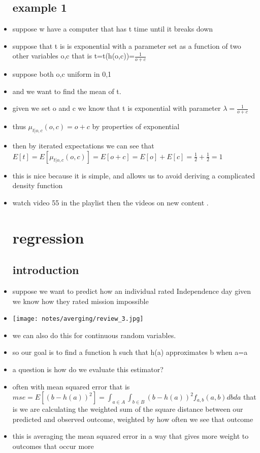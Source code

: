\documentclass{article}
\begin{document}
\begin{itemize}
\subsection{example 1 }
\item suppose w have a computer that has t time until it breaks down 
\item suppose that t is is exponential with a parameter set as a function of two other variables o,c that is t=t(h(o,c))=$\frac{1}{o+c}$
\item suppose both o,c uniform in 0,1 
\item and we want to find the mean of t. 
\item given we set o and c we know that t is exponential with parameter $\lambda=\frac{1}{o+c}$
\item thus $\mu_{t|o,c}(o,c)=o+c$ by properties of exponential 
\item then by iterated expectations we can see that $E[t]=E[\mu_{t|o,c}(o,c)]=E[o+c]=E[o]+E[c]=\frac{1}{2}+\frac{1}{2}=1$
\item this is nice because it is simple, and allows us to avoid deriving a complicated density function 
\item watch video 55 in the playlist then the videos on new content .


\section{regression}
\subsection{introduction}
\item suppose we want to predict how an individual rated Independence day given we know how they rated mission impossible 
\item \texttt{[image: notes/averging/review\_3.jpg]} 
\item we can also do this for continuous random variables.
\item so our goal is to find a function h such that h(a) approximates b when a=a
\item a question is how do we evaluate this estimator? 
\item often with mean squared error that is $mse=E[(b-h(a))^2]=\int_{a\in A}\int_{b\in B} (b-h(a))^2f_{a,b}(a,b)dbda$ that is we are calculating the weighted sum of the square distance between our predicted and observed outcome, weighted by how often we see that outcome  
\item this is averaging the mean squared error in a way that gives more weight to outcomes that occur more 

\end{itemize}
\end{document}

